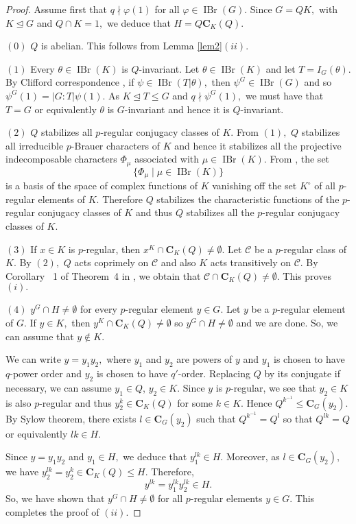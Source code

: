 \documentclass[12pt]{amsart}
\theoremstyle{remark}
\numberwithin{equation}{section}
\begin{document}
\begin{proof}
Assume first that $q\nmid \varphi(1)$ for all $\varphi\in\operatorname{IBr}(G).$  Since $G=QK,$ with $K\unlhd G$ and $Q\cap K=1,$ we deduce that $H=Q{\mathbf{C}}_K(Q).$

\medskip
$(0)$ $Q$ is abelian. This follows from Lemma \ref{lem2}$(ii).$

\medskip

$(1)$ Every $\theta\in\operatorname{IBr}(K)$ is $Q$-invariant. Let $\theta\in\operatorname{IBr}(K)$ and let $T=I_G(\theta).$ By Clifford correspondence \cite[Theorem~8.9]{Navarro}, if $\psi\in\operatorname{IBr}(T\vert\theta),$ then $\psi^G\in\operatorname{IBr}(G)$ and so $\psi^G(1)=|G:T|\psi(1).$ As $K\unlhd T\le G$ and $q\nmid \psi^G(1),$ we must have that $T=G$ or equivalently $\theta$ is $G$-invariant and hence it is $Q$-invariant.

\medskip
$(2)$ $Q$ stabilizes all $p$-regular conjugacy classes of $K.$ From $(1),$ $Q$ stabilizes all irreducible $p$-Brauer characters of $K$ and hence it stabilizes all the projective indecomposable characters $\Phi_\mu$ associated with $\mu\in\operatorname{IBr}(K).$ From \cite[Theorem~2.13]{Navarro}, the set \[\{\Phi_\mu \mid \mu \in \operatorname{IBr}(K)\}\] is a basis of the space of complex functions of $K$ vanishing off the set $K^\circ$ of all $p$-regular elements of $K.$ Therefore $Q$ stabilizes the characteristic functions of the $p$-regular conjugacy classes of $K$ and thus $Q$ stabilizes all the $p$-regular conjugacy classes of $K.$

\medskip
$(3)$ If $x\in K$ is $p$-regular, then $x^K\cap {\mathbf{C}}_K(Q)\neq\emptyset.$ Let ${{\mathcal C}}$ be a $p$-regular class of $K.$  By $(2),$ $Q$ acts coprimely on ${{\mathcal C}}$ and also $K$ acts transitively on ${{\mathcal C}}.$ By  Corollary ~1 of Theorem~4 in \cite{Glauberman}, we obtain that ${{\mathcal C}}\cap {\mathbf{C}}_K(Q)\neq\emptyset.$ This proves $(i).$

\medskip
$(4)$ $y^G\cap H\neq\emptyset$ for every $p$-regular element $y\in G.$ Let $y$ be a $p$-regular element of $G$. If $y\in K,$ then $y^K\cap {\mathbf{C}}_K(Q)\neq\emptyset$ so $y^G\cap H\neq\emptyset$ and we are done. So, we can assume that $y\not\in K.$

We can write $y=y_1y_2,$ where  $y_1$ and $y_2$ are powers of $y$ and  $y_1$ is chosen to have $q$-power order and $y_2$ is chosen to have $q'$-order. Replacing $Q$ by its conjugate if necessary, we can assume $y_1\in Q$, $y_2\in K$. Since $y$ is $p$-regular, we see that $y_2\in K$ is also $p$-regular and thus $y_2^k\in{\mathbf{C}}_K(Q)$ for some $k\in K.$ Hence $Q^{k^{-1}}\leq {\mathbf{C}}_G(y_2).$ By Sylow theorem, there exists $l\in {\mathbf{C}}_G(y_2)$ such that $Q^{k^{-1}}=Q^l$ so that $Q^{lk}=Q$ or equivalently $lk\in H.$

Since $y=y_1y_2$ and $y_1\in H,$ we deduce that $y_1^{lk}\in H.$ Moreover, as $l\in{\mathbf{C}}_G(y_2),$ we have $y_2^{lk}=y_2^k\in {\mathbf{C}}_K(Q)\leq H.$ Therefore,  $$y^{lk}=y_1^{lk}y_2^{lk}\in H.$$
So, we have shown that $y^G\cap H\neq\emptyset$ for all $p$-regular elements $y\in G.$ This completes the proof of $(ii).$
\end{proof}
\end{document}
